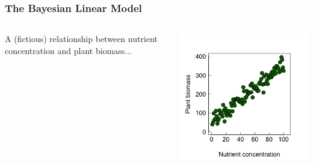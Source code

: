 \documentclass{beamer}
\begin{document}
\begin{frame}
    \frametitle{The Bayesian Linear Model}
    \begin{columns}
        \begin{column}{0.4\textwidth}
            A (fictious) relationship between nutrient concentration and plant biomass...
        \end{column}
        \begin{column}{0.6\textwidth}
            \includegraphics[width=\textwidth]{lectures/day_11_bayesian_lm/figures/unnamed-chunk-2-1.png}
        \end{column}
    \end{columns}
\end{frame}
\end{document}
